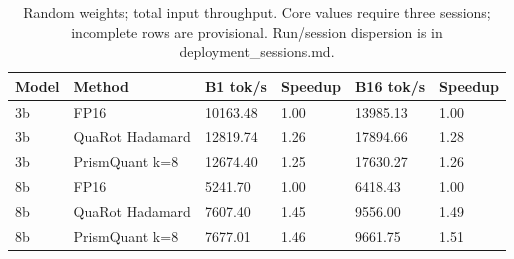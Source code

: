 \begin{table}[t]
\centering
\small
\caption{Random weights; total input throughput. Core values require three sessions; incomplete rows are provisional. Run/session dispersion is in deployment\_sessions.md.}
\begin{tabular}{llllll}
\toprule
Model & Method & B1 tok/s & Speedup & B16 tok/s & Speedup \\
\midrule
3b & FP16 & 10163.48 & 1.00 & 13985.13 & 1.00 \\
3b & QuaRot Hadamard & 12819.74 & 1.26 & 17894.66 & 1.28 \\
3b & PrismQuant k=8 & 12674.40 & 1.25 & 17630.27 & 1.26 \\
8b & FP16 & 5241.70 & 1.00 & 6418.43 & 1.00 \\
8b & QuaRot Hadamard & 7607.40 & 1.45 & 9556.00 & 1.49 \\
8b & PrismQuant k=8 & 7677.01 & 1.46 & 9661.75 & 1.51 \\
\bottomrule
\end{tabular}
\end{table}
